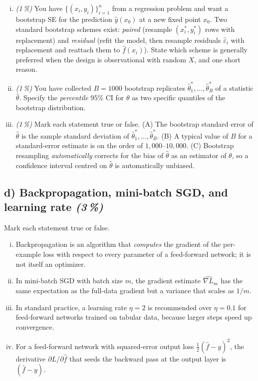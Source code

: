 \documentclass[11pt,a4paper]{article}
\newcommand{\subpoints}[1]{\textit{(#1\,\%)}}
\begin{document}
\begin{enumerate}[(i)]
  \item \subpoints{1} You have $\{(x_i, y_i)\}_{i=1}^n$ from a regression problem and want a bootstrap SE for the prediction $\hat y(x_0)$ at a new fixed point $x_0$. Two standard bootstrap schemes exist: \emph{paired} (resample $(x_i^*, y_i^*)$ rows with replacement) and \emph{residual} (refit the model, then resample residuals $\hat\varepsilon_i$ with replacement and reattach them to $\hat f(x_i)$). State which scheme is generally preferred when the design is observational with random $X$, and one short reason.
  \item \subpoints{1} You have collected $B = 1000$ bootstrap replicates $\hat\theta^*_1, \dots, \hat\theta^*_B$ of a statistic $\hat\theta$. Specify the \emph{percentile} $95\%$ CI for $\theta$ as two specific quantiles of the bootstrap distribution.
  \item \subpoints{1} Mark each statement true or false. (A) The bootstrap standard error of $\hat\theta$ is the sample standard deviation of $\hat\theta^*_1, \dots, \hat\theta^*_B$. (B) A typical value of $B$ for a standard-error estimate is on the order of $1{,}000$--$10{,}000$. (C) Bootstrap resampling \emph{automatically} corrects for the bias of $\hat\theta$ as an estimator of $\theta$, so a confidence interval centred on $\hat\theta$ is automatically unbiased.
\end{enumerate}

\subsection*{d) Backpropagation, mini-batch SGD, and learning rate \subpoints{3}}
Mark each statement true or false.
\begin{enumerate}[(i)]
  \item Backpropagation is an algorithm that \emph{computes} the gradient of the per-example loss with respect to every parameter of a feed-forward network; it is not itself an optimizer.
  \item In mini-batch SGD with batch size $m$, the gradient estimate $\widehat{\nabla L}_m$ has the same expectation as the full-data gradient but a variance that scales as $1/m$.
  \item In standard practice, a learning rate $\eta = 2$ is recommended over $\eta = 0.1$ for feed-forward networks trained on tabular data, because larger steps speed up convergence.
  \item For a feed-forward network with squared-error output loss $\tfrac{1}{2}(\hat f - y)^2$, the derivative $\partial L / \partial \hat f$ that seeds the backward pass at the output layer is $(\hat f - y)$.
\end{enumerate}
\end{document}
